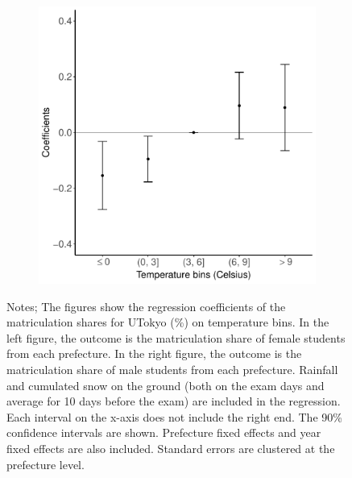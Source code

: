 \documentclass[10pt, pdfmx,hiresbb]{beamer}
\begin{document}
\begin{frame}
\begin{figure}
\begin{minipage}{0.43\textwidth}
\begin{figure}[h]
        \includegraphics[width = \textwidth]{../Output/images/reg_gender_4.pdf}
        \centering
      \end{figure}
    \end{minipage}
    \tiny
    \begin{tablenotes}
    \item Notes;
      The figures show the regression coefficients of the matriculation shares for UTokyo (\%) on temperature bins.
      In the left figure, the outcome is the matriculation share of female students from each prefecture.
      In the right figure, the outcome is the matriculation share of male students from each prefecture.
      Rainfall and cumulated snow on the ground (both on the exam days and average for 10 days before the exam) are included in the regression.
      Each interval on the x-axis does not include the right end.
      The 90\% confidence intervals are shown.
      Prefecture fixed effects and year fixed effects are also included.
      Standard errors are clustered at the prefecture level.
    \end{tablenotes}
  \end{figure}
\end{frame}
\end{document}
